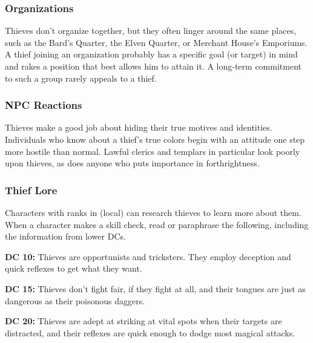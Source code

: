 \subsubsection{Organizations}
Thieves don't organize together, but they often linger around the same places, such as the Bard's Quarter, the Elven Quarter, or Merchant House's Emporiums. A thief joining an organization probably has a specific goal (or target) in mind and rakes a position that best allows him to attain it. A long-term commitment to such a group rarely appeals to a thief.

\subsubsection{NPC Reactions}
Thieves make a good job about hiding their true motives and identities. Individuals who know about a thief's true colors begin with an attitude one step more hostile than normal. Lawful clerics and templars in particular look poorly upon thieves, as does anyone who puts importance in forthrightness.

\subsubsection{Thief Lore}
Characters with ranks in  (local) can research thieves to learn more about them. When a character makes a skill check, read or paraphrase the following, including the information from lower DCs.

\textbf{DC 10:} Thieves are opportunists and tricksters. They employ deception and quick reflexes to get what they want.

\textbf{DC 15:} Thieves don't fight fair, if they fight at all, and their tongues are just as dangerous as their poisonous daggers.

\textbf{DC 20:} Thieves are adept at striking at vital spots when their targets are distracted, and their reflexes are quick enough to dodge most magical attacks.
